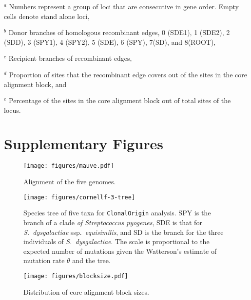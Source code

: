 \documentclass[english]{article}
\begin{document}
\begin{table}
{$^a$ Numbers represent a group of loci that are consecutive in gene order. Empty
cells denote stand alone loci,

$^b$ Donor branches of homologous recombinant edges, 0 (SDE1), 1 (SDE2), 2
(SDD), 3 (SPY1), 4 (SPY2), 5 (SDE), 6 (SPY), 7(SD), and 8(ROOT),

$^c$ Recipient branches of recombinant edges,

$^d$ Proportion of sites that the recombinant edge covers out of the sites in
the core alignment block, and

$^e$ Percentage of the sites in the core alignment block out of total sites of
the locus.
}

\end{table}
\clearpage{}


\section*{Supplementary Figures}

\clearpage{}

\begin{figure}
\begin{center}
\texttt{[image: figures/mauve.pdf]}
\end{center}
\vspace{-1.2in}
\caption{Alignment of the five genomes.}
\label{fig:mauve}
\end{figure}
\clearpage{}

\begin{figure}
\texttt{[image: figures/cornellf-3-tree]}
\caption{\label{fig:tree5}Species tree of five taxa for \texttt{ClonalOrigin} analysis.
SPY is the branch of a clade\textit{ of Streptococcus pyogenes}, SDE
is that for \textit{S.\ dysgalactiae} ssp.\textit{\ equisimilis}, and SD is the
branch for the three individuals of \textit{S.\ dysgalactiae}. The scale is
proportional to the expected number of mutations given the Watterson's estimate 
of mutation
rate $\theta$ and the tree.}
\end{figure}
\clearpage{}%

\begin{figure}
\begin{center}
\texttt{[image: figures/blocksize.pdf]}
\end{center}
\vspace{-.3in}
\caption{Distribution of core alignment block sizes.}
\label{fig:blocksize}
\end{figure}
\clearpage{}%
\end{document}
